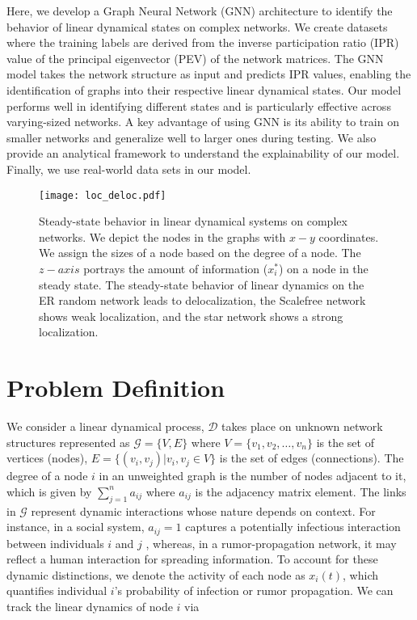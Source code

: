\documentclass[aps, prd, showpacs, floatfix, superscriptaddress, twocolumn, nofootinbib, preprintnumbers, longbibliography]{revtex4-2}
\begin{document}
Here, we develop a Graph Neural Network (GNN) architecture to identify the behavior of linear dynamical states on complex networks. We create datasets where the training labels are derived from the inverse participation ratio (IPR) value of the principal eigenvector (PEV) of the network matrices. The GNN model takes the network structure as input and predicts IPR values, enabling the identification of graphs into their respective linear dynamical states. Our model performs well in identifying different states and is particularly effective across varying-sized networks. A key advantage of using GNN is its ability to train on smaller networks and generalize well to larger ones during testing. We also provide an analytical framework to understand the explainability of our model. Finally, we use real-world data sets in our model.


\begin{figure*}[tbh]
\begin{center}
\texttt{[image: loc\_deloc.pdf]}
\caption{Steady-state behavior in linear dynamical systems on complex networks. We depict the nodes in the graphs with $x-y$ coordinates. We assign the sizes of a node based on the degree of a node. The $z-axis$ portrays the amount of information ($x_i^{*}$) on a node in the steady state. The steady-state behavior of linear dynamics on the ER random network leads to delocalization, the Scalefree network shows weak localization, and the star network shows a strong localization.}
\label{different_linear_dynamic_states}
\end{center}
\end{figure*}

\section{Problem Definition}
We consider a linear dynamical process, $\mathcal{D}$ takes place on unknown network structures represented as $\mathcal{G} = \{V, E\}$ where $V = \{v_{1}, v_{2}, \ldots, v_{n} \}$ is the set of vertices (nodes), $E = \{(v_{i}, v_{j}) | v_{i}, v_{j} \in V \}$ is the set of edges (connections). The degree of a node $i$ in an unweighted graph is the number of nodes adjacent to it, which is given by $\sum_{j=1}^{n} a_{ij}$ where $a_{ij}$ is the adjacency matrix element. The links in $\mathcal{G}$ represent dynamic interactions whose nature depends on context. For instance, in a social system, $a_{ij} = 1$ captures a potentially infectious interaction between individuals $i$ and $j$ \cite{pevecnatphys2013}, whereas, in a rumor-propagation network, it may reflect a human interaction for spreading information. To account for these dynamic distinctions, we denote the activity of each node as $x_i(t)$, which quantifies individual $i$’s probability of infection or rumor propagation. We can track the linear dynamics of node $i$ via 
\end{document}
